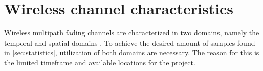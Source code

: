
\section{Wireless channel characteristics}


Wireless multipath fading channels are characterized in two domains, namely the temporal and spatial domains \citep[p. 40-42]{stochasticWirelessChan}. To achieve the desired amount of samples found in \autoref{sec:statistics}, utilization of both domains are necessary. The reason for this is the limited timeframe and available locations for the project.


